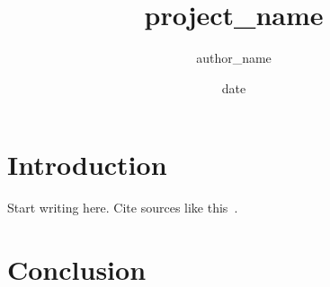 \documentclass{report}
\title{{project_name}}
\author{{author_name}}
\date{{date}}
\begin{document}
\maketitle
\tableofcontents

\chapter{Introduction}

Start writing here. Cite sources like this~\cite{sample}.

\chapter{Conclusion}

\printbibliography
\end{document}
